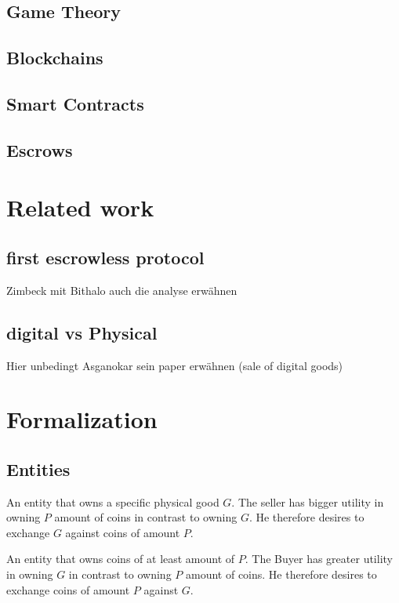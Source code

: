 \documentclass{cacthesis}
\begin{document}
\section{Game Theory}
\section{Blockchains}
\section{Smart Contracts}
\section{Escrows}

\chapter{Related work}
\section{first escrowless protocol}
Zimbeck mit Bithalo
auch die analyse erwähnen
\section{digital vs Physical}
Hier unbedingt Asganokar sein paper erwähnen (sale of digital goods)

\chapter{Formalization}
\section{Entities}

An entity that owns a specific physical good $G$. The seller has bigger utility in owning $P$ amount of coins in contrast to owning $G$. He therefore desires to exchange $G$ against coins of amount $P$.


An entity that owns coins of at least amount of $P$. The Buyer has greater utility in owning $G$ in contrast to  owning $P$ amount of coins. He therefore desires to exchange coins of amount $P$ against $G$.

\end{document}
